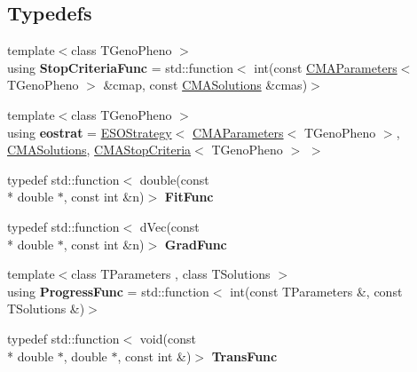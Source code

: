\subsection*{Typedefs}
\begin{DoxyCompactItemize}
\item 
\hypertarget{namespacelibcmaes_a0ea49cc676992a7089a563279ca35df0}{{\footnotesize template$<$class T\-Geno\-Pheno $>$ }\\using {\bfseries Stop\-Criteria\-Func} = std\-::function$<$ int(const \hyperlink{classlibcmaes_1_1CMAParameters}{C\-M\-A\-Parameters}$<$ T\-Geno\-Pheno $>$ \&cmap, const \hyperlink{classlibcmaes_1_1CMASolutions}{C\-M\-A\-Solutions} \&cmas)$>$}\label{namespacelibcmaes_a0ea49cc676992a7089a563279ca35df0}

\item 
\hypertarget{namespacelibcmaes_a5d26dcaad08b23bcacac2631ba9f0f2c}{{\footnotesize template$<$class T\-Geno\-Pheno $>$ }\\using {\bfseries eostrat} = \hyperlink{classlibcmaes_1_1ESOStrategy}{E\-S\-O\-Strategy}$<$ \hyperlink{classlibcmaes_1_1CMAParameters}{C\-M\-A\-Parameters}$<$ T\-Geno\-Pheno $>$, \hyperlink{classlibcmaes_1_1CMASolutions}{C\-M\-A\-Solutions}, \hyperlink{classlibcmaes_1_1CMAStopCriteria}{C\-M\-A\-Stop\-Criteria}$<$ T\-Geno\-Pheno $>$ $>$}\label{namespacelibcmaes_a5d26dcaad08b23bcacac2631ba9f0f2c}

\item 
\hypertarget{namespacelibcmaes_aaa4766cb6addd3ad397456a779436854}{typedef std\-::function$<$ double(const \\*
double $\ast$, const int \&n)$>$ {\bfseries Fit\-Func}}\label{namespacelibcmaes_aaa4766cb6addd3ad397456a779436854}

\item 
\hypertarget{namespacelibcmaes_ae29f09cdf8b5322ac32dc9ccddecd9dd}{typedef std\-::function$<$ d\-Vec(const \\*
double $\ast$, const int \&n)$>$ {\bfseries Grad\-Func}}\label{namespacelibcmaes_ae29f09cdf8b5322ac32dc9ccddecd9dd}

\item 
\hypertarget{namespacelibcmaes_a8d4db4c2a1758fd5964499aba7cf8a9f}{{\footnotesize template$<$class T\-Parameters , class T\-Solutions $>$ }\\using {\bfseries Progress\-Func} = std\-::function$<$ int(const T\-Parameters \&, const T\-Solutions \&)$>$}\label{namespacelibcmaes_a8d4db4c2a1758fd5964499aba7cf8a9f}

\item 
\hypertarget{namespacelibcmaes_a05b1e5e516cec9483ccdb964284ef82c}{typedef std\-::function$<$ void(const \\*
double $\ast$, double $\ast$, const int \&)$>$ {\bfseries Trans\-Func}}\label{namespacelibcmaes_a05b1e5e516cec9483ccdb964284ef82c}

\end{DoxyCompactItemize}
